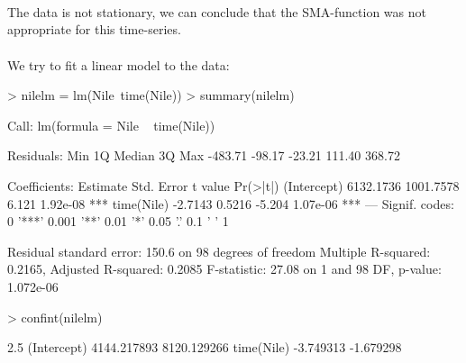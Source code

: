 \documentclass[10pt, a4paper]{article} %
\begin{document}
\\
\\
\\
The data is not stationary, we can conclude that the SMA-function was not appropriate for this time-series.\\
\\
\noindent We try to fit a linear model to the data:\\
\begin{Schunk}
\begin{Sinput}
> nilelm = lm(Nile~time(Nile))
> summary(nilelm)
\end{Sinput}
\begin{Soutput}
Call:
lm(formula = Nile ~ time(Nile))

Residuals:
    Min      1Q  Median      3Q     Max 
-483.71  -98.17  -23.21  111.40  368.72 

Coefficients:
             Estimate Std. Error t value Pr(>|t|)    
(Intercept) 6132.1736  1001.7578   6.121 1.92e-08 ***
time(Nile)    -2.7143     0.5216  -5.204 1.07e-06 ***
---
Signif. codes:  
0 '***' 0.001 '**' 0.01 '*' 0.05 '.' 0.1 ' ' 1

Residual standard error: 150.6 on 98 degrees of freedom
Multiple R-squared:  0.2165,	Adjusted R-squared:  0.2085 
F-statistic: 27.08 on 1 and 98 DF,  p-value: 1.072e-06
\end{Soutput}
\begin{Sinput}
> confint(nilelm)
\end{Sinput}
\begin{Soutput}
                  2.5 %
(Intercept) 4144.217893 8120.129266
time(Nile)    -3.749313   -1.679298
\end{Soutput}
\end{Schunk}
\end{document}
